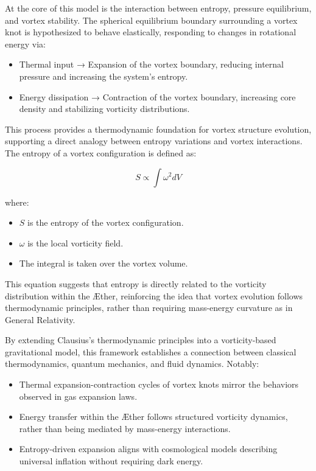 \documentclass[a4paper,10pt]{article}
\begin{document}
    At the core of this model is the interaction between entropy, pressure equilibrium, and vortex stability. The spherical equilibrium boundary surrounding a vortex knot is hypothesized to behave elastically, responding to changes in rotational energy via:
    \begin{itemize}
        \item Thermal input → Expansion of the vortex boundary, reducing internal pressure and increasing the system’s entropy.
        \item Energy dissipation → Contraction of the vortex boundary, increasing core density and stabilizing vorticity distributions.
    \end{itemize}

    This process provides a thermodynamic foundation for vortex structure evolution, supporting a direct analogy between entropy variations and vortex interactions. The entropy of a vortex configuration is defined as:

    \begin{equation} \label{eq:Entropy}
        S \propto \int \omega^2 dV
    \end{equation}

    where:

    \begin{itemize}
        \item \( S \) is the entropy of the vortex configuration.
        \item \( \omega \)  is the local vorticity field.
        \item The integral is taken over the vortex volume.
    \end{itemize}

    This equation suggests that entropy is directly related to the vorticity distribution within the \AE ther, reinforcing the idea that vortex evolution follows thermodynamic principles, rather than requiring mass-energy curvature as in General Relativity.

    By extending Clausius’s thermodynamic principles into a vorticity-based gravitational model, this framework establishes a connection between classical thermodynamics, quantum mechanics, and fluid dynamics. Notably:

    \begin{itemize}
        \item Thermal expansion-contraction cycles of vortex knots mirror the behaviors observed in gas expansion laws.
        \item Energy transfer within the \AE ther follows structured vorticity dynamics, rather than being mediated by mass-energy interactions.
        \item Entropy-driven expansion aligns with cosmological models describing universal inflation without requiring dark energy.
    \end{itemize}
\end{document}
